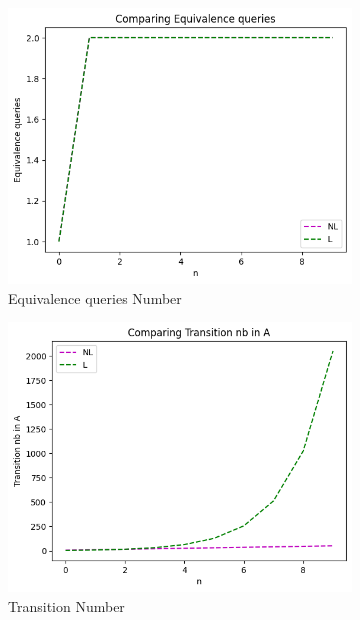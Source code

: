 \begin{figure}[!htb]
  \begin{subfigure}[b]{0.25\textwidth}
    \includegraphics[width=\textwidth]{../statistics/plots/wrostDFA/Equivalence queries.png}
    \caption{Equivalence queries Number}
    \label{fig:EquivWrostDFACompare}
  \end{subfigure}
  \begin{subfigure}[b]{0.25\textwidth}
    \includegraphics[width=\textwidth]{../statistics/plots/wrostDFA/Transition nb in A.png}
    \caption{Transition Number}
    \label{fig:TransitionWrostDFACompare}
  \end{subfigure}
  \begin{subfigure}[b]{0.25\textwidth}

\end{subfigure}
\end{figure}
